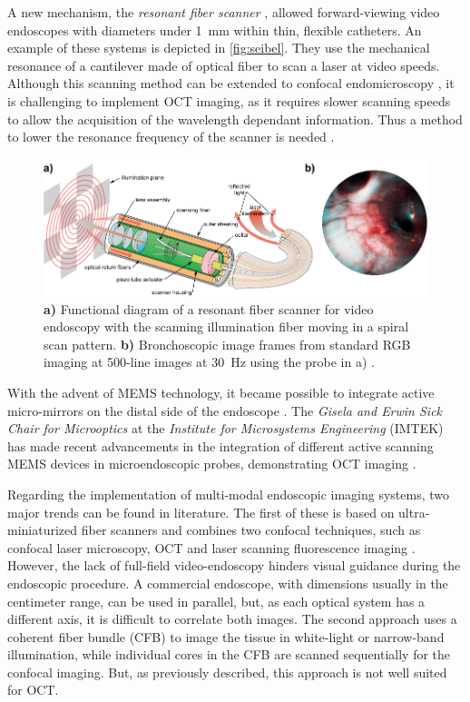 A new mechanism, the \textit{resonant fiber scanner} \cite{Seibel2001}, allowed forward-viewing video endoscopes with diameters under \SI{1}{\milli\meter} within thin, flexible catheters. An example of these systems is depicted in \autoref{fig:seibel}. They use the mechanical resonance of  a cantilever made of optical fiber to scan a laser at video speeds. Although this scanning method can be extended to confocal endomicroscopy \cite{Meinert}, it is challenging to implement OCT imaging, as it requires slower scanning speeds to allow the acquisition of the wavelength dependant information. Thus a method to lower the resonance frequency of the scanner is needed \cite{Huo2010}.

\begin{figure}[h!]\centering
      \includegraphics{figures/10_Introduction/seibel.pdf}
      \caption{\textbf{a)} Functional diagram of a resonant fiber scanner for video endoscopy with the scanning illumination fiber moving in a spiral scan pattern. \textbf{b)} Bronchoscopic image frames from standard RGB imaging at 500-line images at \SI{30}{\hertz} using the probe in a) \cite{Lee2010}.}
      \label{fig:seibel}
\end{figure}

With the advent of MEMS technology, it became possible to integrate active micro-mirrors on the distal side of the endoscope \cite{Liu2011}. The \emph{Gisela and Erwin Sick Chair for Microoptics} at the \emph{Institute for Microsystems Engineering} (IMTEK) has made recent advancements in the integration of different active scanning MEMS devices in microendoscopic probes, demonstrating OCT imaging \cite{Weber2012}.

Regarding the implementation of multi-modal endoscopic imaging systems, two major trends can be found in literature. The first of these is based on ultra-miniaturized fiber scanners and combines two confocal techniques, such as confocal laser microscopy, OCT and laser scanning fluorescence imaging \cite{Lorenser2013,Yoo2011}. However, the lack of full-field video-endoscopy hinders visual guidance during the endoscopic procedure. A commercial endoscope, with dimensions usually in the centimeter range, can be used in parallel, but, as each optical system has a different axis, it is difficult to correlate both images. The second approach uses a coherent fiber bundle (CFB) to image the tissue in white-light or narrow-band illumination, while individual cores in the CFB are scanned sequentially for the confocal imaging. But, as previously described, this approach is not well suited for OCT.

